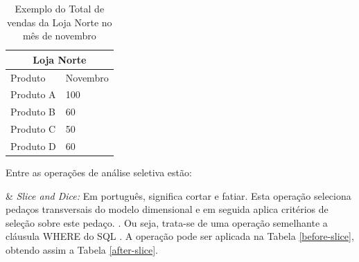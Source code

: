 \begin{table}[!ht]
\centering
\begin{tabular}{|l|l|}
\hline
\multicolumn{2}{|c|}{Loja Norte} \\ \hline
\cline{1-2}
Produto         & Novembro       \\ \hline
Produto A & 100 \\ \hline
Produto B & 60  \\ \hline
Produto C & 50  \\ \hline
Produto D & 60  \\ \hline

\end{tabular}
\caption{Exemplo do Total de vendas da Loja Norte no mês de novembro}
\label{after-across}
\end{table}
\FloatBarrier

Entre as operações de análise seletiva estão:

\begin{easylist}[itemize]

& \textit{Slice and Dice:} Em português, significa cortar e fatiar. Esta operação seleciona pedaços transversais do modelo dimensional e em seguida aplica critérios de seleção sobre este pedaço. \cite{andre2000}. Ou seja, trata-se de uma operação semelhante a cláusula WHERE do SQL \cite{valeria2012}. A operação pode ser aplicada na Tabela \ref{before-slice}, obtendo assim a Tabela \ref{after-slice}.


\end{easylist}

